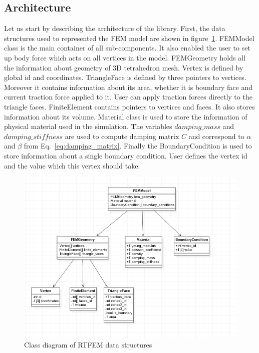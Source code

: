 \documentclass[en]{minipw} %
\begin{document}
\subsection{Architecture}
Let us start by describing the architecture of the library. First, the data structures used to represented the FEM model are shown in figure~\ref{fig:uml_fem_model}. FEMModel class is the main container of all sub-components. It also enabled the user to set up body force which acts on all vertices in the model. FEMGeometry holds all the information about geometry of 3D tetrahedron mesh. Vertex is defined by global id and coordinates. TriangleFace is defined by three pointers to vertices. Moreover it contains information about its area, whether it is boundary face and current traction force applied to it. User can apply traction forces directly to the triangle faces. FiniteElement contains pointers to vertices and faces. It also stores information about its volume. Material class is used to store the information of physical material used in the simulation. The variables $damping\_mass$ and $damping\_stiffness$ are used to compute damping matrix $C$ and correspond to $\alpha$ and $\beta$ from Eq.~\ref{eq:damping_matrix}. Finally the BoundaryCondition is used to store information about a single boundary condition. User defines the vertex id and the value which this vertex should take.

\begin{figure}[h!]
\centering
\includegraphics[scale=0.6]{pictures/fem_model.png}
\caption[Class diagram of RTFEM data structures]{Class diagram of RTFEM data structures}
\label{fig:uml_fem_model}
\end{figure}
\end{document}
